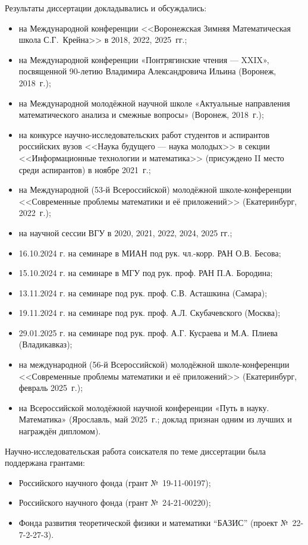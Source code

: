 Результаты диссертации докладывались и обсуждались:
\begin{itemize}
	\item
		на Международной конференции <<Воронежская Зимняя Математическая школа С.Г.~Крейна>> в 2018, 2022, 2025~гг.;
	\item
		на Международной конференции «Понтрягинские чтения — XXIX», посвященной 90-летию Владимира Александровича Ильина (Воронеж, 2018~г.);
	\item
		на Международной молодёжной научной школе «Актуальные направления математического анализа и смежные вопросы» (Воронеж, 2018~г.);
	\item
		на конкурсе научно-исследовательских работ студентов и аспирантов российских вузов
		<<Наука будущего --- наука молодых>> в секции <<Информационные технологии и математика>>
		(присуждено II место среди аспирантов) в ноябре 2021~г.;
	\item
		на Международной (53-й Всероссийской) молодёжной школе-конференции
		<<Современные проблемы математики и её приложений>>
		(Екатеринбург, 2022~г.);
	\item
		на научной сессии ВГУ в 2020, 2021, 2022, 2024, 2025 гг.; %
	\item
		16.10.2024 г. на семинаре в МИАН под рук. чл.-корр. РАН О.В. Бесова;
	\item
		15.10.2024 г. на семинаре в МГУ под рук. проф. РАН П.А. Бородина;
	\item
		13.11.2024 г. на семинаре под рук. проф. С.В. Асташкина (Самара);
	\item
		19.11.2024 г. на семинаре под рук. проф. А.Л. Скубачевского (Москва);
	\item
		29.01.2025 г. на семинаре под рук. проф. А.Г. Кусраева и М.А. Плиева (Владикавказ);
	\item
		на международной (56-й Всероссийской) молодёжной школе-конференции
		<<Современные проблемы математики и её приложений>>
		(Екатеринбург, февраль 2025~г.);
	\item
		на Всероссийской молодёжной научной конференции «Путь в науку. Математика»
		(Ярославль, май 2025~г.; доклад признан одним из лучших и награждён дипломом).
\end{itemize}

Научно-исследовательская работа соискателя по теме диссертации была поддержана грантами:
\begin{itemize}
	\item
		Российского научного фонда (грант №~19-11-00197);
	\item
		Российского научного фонда (грант №~24-21-00220);
	\item
		Фонда развития теоретической физики и математики ``БАЗИС'' (проект №~22-7-2-27-3).
\end{itemize}

